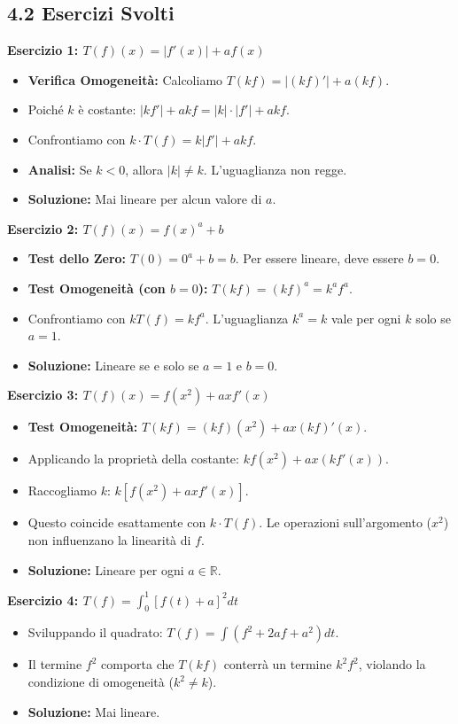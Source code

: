 \documentclass[10pt,a4paper]{article}
\begin{document}
\subsection*{4.2 Esercizi Svolti}

\textbf{Esercizio 1: $T(f)(x) = |f'(x)| + a f(x)$}
\begin{itemize}
    \item \textbf{Verifica Omogeneità:} Calcoliamo $T(kf) = |(kf)'| + a(kf)$.
    \item Poiché $k$ è costante: $|k f'| + akf = |k| \cdot |f'| + akf$.
    \item Confrontiamo con $k \cdot T(f) = k |f'| + akf$.
    \item \textbf{Analisi:} Se $k < 0$, allora $|k| \neq k$. L'uguaglianza non regge.
    \item \textbf{Soluzione:} Mai lineare per alcun valore di $a$.
\end{itemize}

\textbf{Esercizio 2: $T(f)(x) = f(x)^a + b$}
\begin{itemize}
    \item \textbf{Test dello Zero:} $T(0) = 0^a + b = b$. Per essere lineare, deve essere $b=0$.
    \item \textbf{Test Omogeneità (con $b=0$):} $T(kf) = (kf)^a = k^a f^a$.
    \item Confrontiamo con $k T(f) = k f^a$. L'uguaglianza $k^a = k$ vale per ogni $k$ solo se $a=1$.
    \item \textbf{Soluzione:} Lineare se e solo se $a=1$ e $b=0$.
\end{itemize}

\textbf{Esercizio 3: $T(f)(x) = f(x^2) + a x f'(x)$}
\begin{itemize}
    \item \textbf{Test Omogeneità:} $T(kf) = (kf)(x^2) + ax(kf)'(x)$.
    \item Applicando la proprietà della costante: $k f(x^2) + ax(k f'(x))$.
    \item Raccogliamo $k$: $k [ f(x^2) + ax f'(x) ]$.
    \item Questo coincide esattamente con $k \cdot T(f)$. Le operazioni sull'argomento ($x^2$) non influenzano la linearità di $f$.
    \item \textbf{Soluzione:} Lineare per ogni $a \in \mathbb{R}$.
\end{itemize}

\textbf{Esercizio 4: $T(f) = \int_{0}^{1} [f(t) + a]^2 dt$}
\begin{itemize}
    \item Sviluppando il quadrato: $T(f) = \int (f^2 + 2af + a^2) dt$.
    \item Il termine $f^2$ comporta che $T(kf)$ conterrà un termine $k^2 f^2$, violando la condizione di omogeneità ($k^2 \neq k$).
    \item \textbf{Soluzione:} Mai lineare.
\end{itemize}
\end{document}
